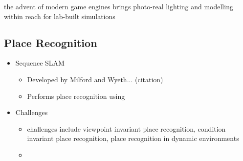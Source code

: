 the advent of modern game engines brings photo-real lighting and modelling within reach for lab-built simulations

\subsection{Place Recognition}

\begin{itemize}
    \item Sequence SLAM
    \begin{itemize}
        \item Developed by Milford and Wyeth... (citation)
        \item Performs place recognition using 
    \end{itemize}
    \item {Challenges}
        \begin{itemize}
            \item challenges include viewpoint invariant place recognition, condition invariant place recognition, place recognition in dynamic environments
            \item 
        \end{itemize}
\end{itemize}
